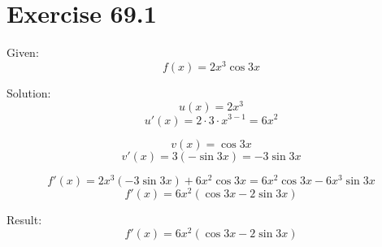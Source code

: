 \documentclass[a4paper, 10pt]{scrartcl}
\begin{document}
\section{Exercise 69.1}

Given:
\[f(x) = 2x^{3}\cos{3x}\]

Solution:
\[u(x) = 2x^{3}\]
\[u'(x) = 2\cdot3\cdot x^{3 - 1} = 6x^{2}\]

\[v(x) = \cos{3x}\]
\[v'(x) = 3(-\sin{3x}) = -3\sin{3x}\]

\[f'(x) = 2x^{3}(-3\sin{3x}) + 6x^{2}\cos{3x} = 6x^{2}\cos{3x} - 6x^{3}\sin{3x}\]
\[f'(x) = 6x^{2}(\cos{3x} - 2\sin{3x})\]

Result:
\[f'(x) = 6x^{2}(\cos{3x} - 2\sin{3x})\]
\end{document}
